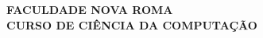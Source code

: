 \begingroup
\singlespacing
\begin{center}
\vspace*{1.2cm}

{\bfseries FACULDADE NOVA ROMA}\\[2pt]
{\bfseries CURSO DE CIÊNCIA DA COMPUTAÇÃO}

\vfill

{\bfseries \tccautor}

\vfill

{\large\bfseries \tcctitulo}

\vfill
\vfill

{\bfseries \MakeUppercase{\tcclocal}}\\[2pt]
{\bfseries \tccano}

\vspace*{0.6cm}
\end{center}
\endgroup
\newpage
